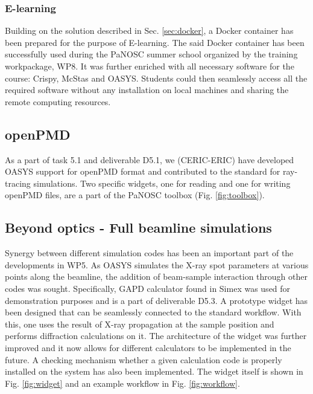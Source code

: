 \documentclass[11pt, a4paper]{article}
\begin{document}
\subsubsection{E-learning}

Building on the solution described in Sec. \ref{sec:docker}, a Docker container has been prepared for the purpose of E-learning. The said Docker container has been successfully used during the PaNOSC summer school organized by the training workpackage, WP8. It was further enriched with all necessary software for the course: Crispy, McStas and OASYS. Students could then seamlessly access all the required software without any installation on local machines and sharing the remote computing resources.

\subsection{openPMD}

As a part of task 5.1 and deliverable D5.1, we (CERIC-ERIC) have developed OASYS support for openPMD format and contributed to the standard for ray-tracing simulations. Two specific widgets, one for reading and one for writing openPMD files, are a part of the PaNOSC toolbox (Fig. \ref{fig:toolbox}).

\subsection{Beyond optics - Full beamline simulations}

Synergy between different simulation codes has been an important part of the developments in WP5. As OASYS simulates the X-ray spot parameters at various points along the beamline, the addition of beam-sample interaction through other codes was sought. Specifically, GAPD calculator found in Simex was used for demonstration purposes and is a part of deliverable D5.3. A prototype widget has been designed that can be seamlessly connected to the standard workflow. With this, one uses the result of X-ray propagation at the sample position and performs diffraction calculations on it. The architecture of the widget was further improved and it now allows for different calculators to be implemented in the future. A checking mechanism whether a given calculation code is properly installed on the system has also been implemented. The widget itself is shown in Fig. \ref{fig:widget} and an example workflow in Fig. \ref{fig:workflow}.
\end{document}
